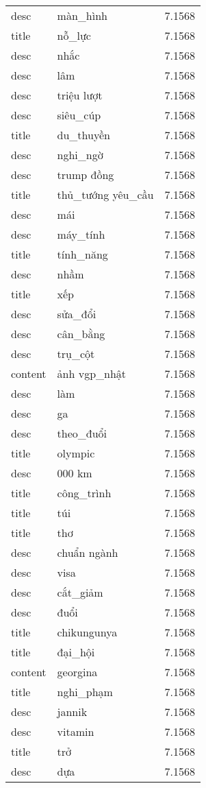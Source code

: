 \documentclass{article}
\begin{document}
\begin{tabular}{lll}
desc & màn\_hình & 7.1568\\
title & nỗ\_lực & 7.1568\\
desc & nhắc & 7.1568\\
desc & lâm & 7.1568\\
desc & triệu lượt & 7.1568\\
desc & siêu\_cúp & 7.1568\\
title & du\_thuyền & 7.1568\\
desc & nghi\_ngờ & 7.1568\\
desc & trump đồng & 7.1568\\
title & thủ\_tướng yêu\_cầu & 7.1568\\
desc & mái & 7.1568\\
desc & máy\_tính & 7.1568\\
title & tính\_năng & 7.1568\\
desc & nhầm & 7.1568\\
title & xếp & 7.1568\\
desc & sửa\_đổi & 7.1568\\
desc & cân\_bằng & 7.1568\\
desc & trụ\_cột & 7.1568\\
content & ảnh vgp\_nhật & 7.1568\\
desc & làm & 7.1568\\
desc & ga & 7.1568\\
desc & theo\_đuổi & 7.1568\\
title & olympic & 7.1568\\
desc & 000 km & 7.1568\\
title & công\_trình & 7.1568\\
title & túi & 7.1568\\
title & thơ & 7.1568\\
desc & chuẩn ngành & 7.1568\\
desc & visa & 7.1568\\
desc & cắt\_giảm & 7.1568\\
desc & đuổi & 7.1568\\
title & chikungunya & 7.1568\\
title & đại\_hội & 7.1568\\
content & georgina & 7.1568\\
title & nghi\_phạm & 7.1568\\
desc & jannik & 7.1568\\
desc & vitamin & 7.1568\\
title & trở & 7.1568\\
desc & dựa & 7.1568\\

\end{tabular}
\end{document}
